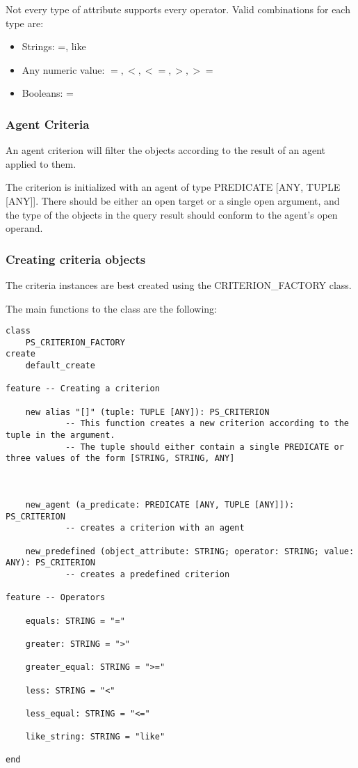 Not every type of attribute supports every operator. Valid combinations for each type are:

 \begin{itemize}
  \item Strings: =, like
  \item Any numeric value: $=, <, <=, >, >=$
  \item Booleans: =
 \end{itemize}


\subsubsection{Agent Criteria}

An agent criterion will filter the objects according to the result of an agent applied to them.

The criterion is initialized with an agent of type PREDICATE [ANY, TUPLE [ANY]]. 
There should be either an open target or a single open argument, and the type of the objects in the query result should conform to the agent's open operand.


\subsubsection{Creating criteria objects}

The criteria instances are best created using the CRITERION\_FACTORY class.

The main functions to the class are the following: 

\begin{lstlisting}[language=OOSC2Eiffel, captionpos=b, caption={The CRITERION\_FACTORY interface}, label={lst:factory_interface}]
class
	PS_CRITERION_FACTORY
create
	default_create

feature -- Creating a criterion

	new alias "[]" (tuple: TUPLE [ANY]): PS_CRITERION
			-- This function creates a new criterion according to the tuple in the argument.
			-- The tuple should either contain a single PREDICATE or three values of the form [STRING, STRING, ANY]



	new_agent (a_predicate: PREDICATE [ANY, TUPLE [ANY]]): PS_CRITERION
			-- creates a criterion with an agent

	new_predefined (object_attribute: STRING; operator: STRING; value: ANY): PS_CRITERION
			-- creates a predefined criterion

feature -- Operators

	equals: STRING = "="

	greater: STRING = ">"

	greater_equal: STRING = ">="

	less: STRING = "<"

	less_equal: STRING = "<="

	like_string: STRING = "like"

end
\end{lstlisting}

